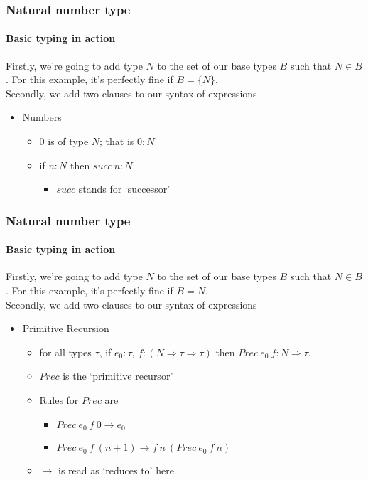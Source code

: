 \documentclass{beamer}
\begin{document}
\begin{frame}
  \frametitle{Natural number type}
  \framesubtitle{Basic typing in action}
  Firstly, we're going to add type $N$ to the set of our base types $B$ such that
  $N \in B$. For this example, it's perfectly fine if $B = \{N\}$.\\
  Secondly, we add two clauses to our syntax of expressions
  \pause
  \begin{itemize}[<+->]
    \item Numbers
      \begin{itemize}
        \item 0 is of type $N$; that is $0:N$
        \item if $n:N$ then $succ\:n:N$
          \begin{itemize}
            \item $succ$ stands for `successor'
          \end{itemize}
      \end{itemize}
  \end{itemize}
\end{frame}
\begin{frame}
  \frametitle{Natural number type}
  \framesubtitle{Basic typing in action}
  Firstly, we're going to add type $N$ to the set of our base types $B$ such that
  $N \in B$. For this example, it's perfectly fine if $B = {N}$.\\
  Secondly, we add two clauses to our syntax of expressions
  \pause
  \begin{itemize}[<+->]
  \item Primitive Recursion
    \begin{itemize}
      \item for all types $\tau$, if $e_0:\tau$, $f:(N \Rightarrow
        \tau \Rightarrow \tau)$ then $Prec\:e_0\:f:N \Rightarrow
        \tau$.
      \item $Prec$ is the `primitive recursor'
      \item Rules for $Prec$ are
      \begin{itemize}
        \item $Prec\:e_0\:f\:0 \rightarrow e_0$
        \item $Prec\:e_0\:f\:(n + 1) \rightarrow
          f\:n\:(Prec\:e_0\:f\:n)$
      \end{itemize}
    \item $\rightarrow$ is read as `reduces to' here
    \end{itemize}
  \end{itemize}
\end{frame}
\end{document}
